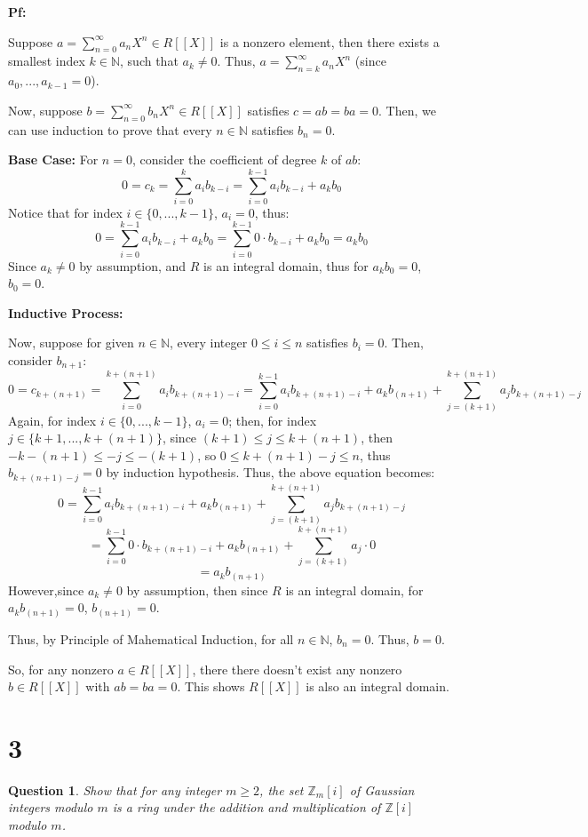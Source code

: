 \documentclass{article}
\newtheorem{question}{Question}
\begin{document}
\textbf{Pf:}

Suppose $a=\sum_{n=0}^{\infty}a_nX^n\in R[[X]]$ is a nonzero element, then there exists a smallest index $k\in\mathbb{N}$, such that $a_k\neq 0$.
Thus, $a=\sum_{n=k}^{\infty}a_nX^n$ (since $a_0,...,a_{k-1}=0$). 

Now, suppose $b=\sum_{n=0}^{\infty}b_nX^n\in R[[X]]$ satisfies $c=ab=ba=0$. Then, we can use induction to prove that every $n\in\mathbb{N}$ satisfies $b_n=0$.

\hfill

\textbf{Base Case:}
For $n=0$, consider the coefficient of degree $k$ of $ab$:
$$0=c_k = \sum_{i=0}^{k}a_ib_{k-i} = \sum_{i=0}^{k-1}a_ib_{k-i}+a_kb_0$$
Notice that for index $i\in\{0,...,k-1\}$, $a_i=0$, thus:
$$0=\sum_{i=0}^{k-1}a_ib_{k-i}+a_kb_0 = \sum_{i=0}^{k-1}0\cdot b_{k-i}+a_kb_0 = a_kb_0$$
Since $a_k\neq 0$ by assumption, and $R$ is an integral domain, thus for $a_kb_0=0$, $b_0=0$.

\hfill

\hfill

\textbf{Inductive Process:}

Now, suppose for given $n\in\mathbb{N}$, every integer $0\leq i\leq n$ satisfies $b_i=0$. Then, consider $b_{n+1}$:
$$0=c_{k+(n+1)} = \sum_{i=0}^{k+(n+1)}a_ib_{k+(n+1)-i} = \sum_{i=0}^{k-1}a_ib_{k+(n+1)-i} +a_kb_{(n+1)}+ \sum_{j=(k+1)}^{k+(n+1)}a_jb_{k+(n+1)-j}$$
Again, for index $i\in\{0,...,k-1\}$, $a_i=0$; then, for index $j\in\{k+1,...,k+(n+1)\}$, since $(k+1)\leq j\leq k+(n+1)$, then $-k-(n+1)\leq -j \leq -(k+1)$, 
so $0 \leq k+(n+1)-j \leq n$, thus $b_{k+(n+1)-j}=0$ by induction hypothesis. Thus, the above equation becomes:
$$0=\sum_{i=0}^{k-1}a_ib_{k+(n+1)-i} +a_kb_{(n+1)}+ \sum_{j=(k+1)}^{k+(n+1)}a_jb_{k+(n+1)-j}$$
$$=\sum_{i=0}^{k-1}0\cdot b_{k+(n+1)-i} + a_kb_{(n+1)}+\sum_{j=(k+1)}^{k+(n+1)}a_j\cdot 0$$
$$ = a_kb_{(n+1)}$$
However,since $a_k\neq 0$ by assumption, then since $R$ is an integral domain, for $a_kb_{(n+1)}=0$, $b_{(n+1)}=0$.

Thus, by Principle of Mahematical Induction, for all $n\in\mathbb{N}$, $b_n=0$. Thus, $b=0$.

So, for any nonzero $a\in R[[X]]$, there there doesn't exist any nonzero $b\in R[[X]]$ with $ab=ba=0$.
This shows $R[[X]]$ is also an integral domain.

\hfill

\hfill

\section*{3}
\begin{myBox}[]{}
    \begin{question}
        Show that for any integer $m\geq 2$, the set $\mathbb{Z}_m[i]$ of Gaussian integers modulo $m$ is a
        ring under the addition and multiplication of $\mathbb{Z}[i]$ modulo $m$.
    \end{question}
\end{myBox}
\end{document}
